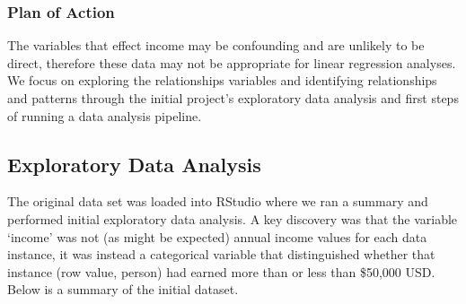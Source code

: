 \documentclass[]{article}
\begin{document}
\hypertarget{plan-of-action}{%
\subsubsection{Plan of Action}\label{plan-of-action}}

The variables that effect income may be confounding and are unlikely to
be direct, therefore these data may not be appropriate for linear
regression analyses. We focus on exploring the relationships variables
and identifying relationships and patterns through the initial project's
exploratory data analysis and first steps of running a data analysis
pipeline.

\hypertarget{exploratory-data-analysis}{%
\subsection{Exploratory Data Analysis}\label{exploratory-data-analysis}}

The original data set was loaded into RStudio where we ran a summary and
performed initial exploratory data analysis. A key discovery was that
the variable `income' was not (as might be expected) annual income
values for each data instance, it was instead a categorical variable
that distinguished whether that instance (row value, person) had earned
more than or less than \$50,000 USD. Below is a summary of the initial
dataset.
\end{document}
